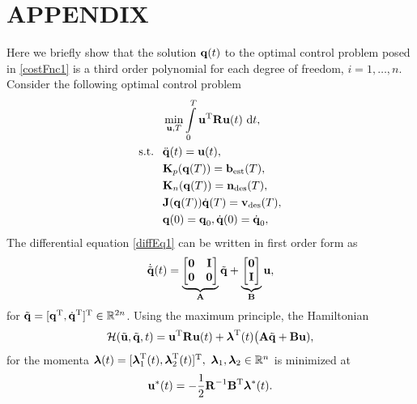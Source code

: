 \section{APPENDIX}\label{appendix}

Here we briefly show that the solution $\boldsymbol{\mathrm{q}}(t)$ to the optimal control problem posed in \eqref{costFnc1} is a third order polynomial for each degree of freedom, $i = 1, \ldots, n$. Consider the following optimal control problem
%
\begin{align}
&\min_{\sysInput,T} \int\limits_{0}^{T}\sysInput^{\mathrm{T}}\vec{R}\sysInput(t) \ \mathrm{d}t, \label{costFnc2} \\
\textrm{s.t. \ } &\ddot{\joint}(t) = \sysInput(t), \label{diffEq1} \\
& \kin_p(\joint(T)) = \ballEst(T), \\
& \kin_n(\joint(T)) = \normal_{\mathrm{des}}(T), \\
&\jac(\joint(T))\dot{\joint}(T) = \racketVel_{\mathrm{des}}(T), \\
&\joint(0) = \joint_{0}, \dot{\joint}(0) = \dot{\joint}_{0}, 
\end{align}
%
The differential equation \eqref{diffEq1} can be written in first order form as 
%
\begin{align}
\dot{\tilde{\boldsymbol{\mathrm{q}}}}(t) = \underbrace{\begin{bmatrix}\boldsymbol{\mathrm{0}} & \boldsymbol{\mathrm{I}} \\ \boldsymbol{\mathrm{0}} & \boldsymbol{\mathrm{0}} \end{bmatrix}}_{\boldsymbol{\mathrm{A}}}\tilde{\boldsymbol{\mathrm{q}}} + \underbrace{\begin{bmatrix}
\boldsymbol{\mathrm{0}} \\ \boldsymbol{\mathrm{I}} \end{bmatrix}}_{\boldsymbol{\mathrm{B}}}\boldsymbol{\mathrm{u}},
\end{align}
%
\noindent for $\tilde{\boldsymbol{\mathrm{q}}} = [\boldsymbol{\mathrm{q}}^{\mathrm{T}}, \dot{\boldsymbol{\mathrm{q}}}^{\mathrm{T}}]^{\mathrm{T}} \in \mathbb{R}^{2n}$. Using the maximum principle, the Hamiltonian 
%
\begin{align}
\mathcal{H}(\tilde{\boldsymbol{\mathrm{u}}},\tilde{\boldsymbol{\mathrm{q}}},t) = \boldsymbol{\mathrm{u}}^{\mathrm{T}}\boldsymbol{\mathrm{R}}\boldsymbol{\mathrm{u}}(t) + \boldsymbol{\mathrm{\lambda}}^{\mathrm{T}}(t)\big(\boldsymbol{\mathrm{A}}\tilde{\boldsymbol{\mathrm{q}}} + \boldsymbol{\mathrm{B}}\boldsymbol{\mathrm{u}}), 
\end{align}
%
\noindent for the momenta $\boldsymbol{\mathrm{\lambda}}(t) = [\boldsymbol{\mathrm{\lambda}}_1^{\mathrm{T}}(t), \boldsymbol{\mathrm{\lambda}}_2^{\mathrm{T}}(t)]^{\mathrm{T}}, \ \boldsymbol{\mathrm{\lambda}}_1, \boldsymbol{\mathrm{\lambda}}_2 \in \mathbb{R}^{n}$ is minimized at 
%
\begin{align}
\boldsymbol{\mathrm{u}}^{*}(t) = -\frac{1}{2} \boldsymbol{\mathrm{R}}^{-1}\boldsymbol{\mathrm{B}}^{\mathrm{T}}\boldsymbol{\mathrm{\lambda}}^{*}(t).
\label{HamiltonianMaxInput}
\end{align}
